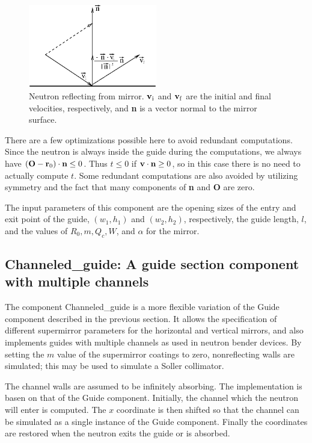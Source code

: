 \begin{figure}
  \begin{center}
    \includegraphics[width=0.5\textwidth]{figures/guide2.eps}
  \end{center}
\caption{Neutron reflecting from mirror. ${\bf v}_{\rm i}$ and 
${\bf v}_{\rm f}$ are the initial and final velocities, respectively,
and {\bf n} is a vector normal to the mirror surface.}
\label{f:guidereflect}
\end{figure}

There are a few optimizations possible here to avoid redundant
computations. Since the neutron is always inside the guide during the
computations, we always have 
$({\bf O} - {\bf r}_0) \cdot {\bf n} \leq 0$. 
Thus $t \leq 0$ if ${\bf v} \cdot {\bf n} \geq 0$, so in this case
there is no need to actually compute $t$. Some redundant computations
are also avoided by utilizing symmetry and the fact that many
components of {\bf n} and {\bf O} are zero.

The input parameters of this component are
the opening sizes of the entry and exit point of the
guide, $(w_1, h_1)$ and $(w_2, h_2)$, respectively,
the guide length, $l$,
and the values of $R_0, m, Q_c, W$, and $\alpha$ for the mirror.


\subsection{Channeled\_guide: A guide section component with multiple channels}
\label{s:channeled_guide}

The component Channeled\_guide is a more flexible variation of the Guide
component described in the previous section. It allows the specification
of different supermirror parameters for the horizontal and vertical
mirrors, and also implements guides with multiple channels as used in
neutron bender devices. By setting the $m$ value of the supermirror
coatings to zero, nonreflecting walls are
simulated; this may be used to simulate a Soller collimator.

The channel walls are assumed to be infinitely absorbing. The
implementation is basen on that of the Guide component. Initially, the
channel which the neutron will enter is computed. The $x$ coordinate is
then shifted so that the channel can be simulated as a single instance
of the Guide component. Finally the coordinates are restored when the
neutron exits the guide or is absorbed.

